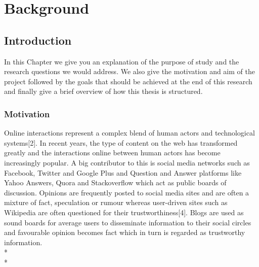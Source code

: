 \part{Background}
\chapter{Introduction}
In this Chapter we give you an explanation of the purpose of study and the research questions we would address. We also give the motivation and aim of the project followed by the goals that should be achieved at the end of this research and finally give a brief overview of how this thesis is structured. 
\section{Motivation}
Online interactions represent a complex blend of human actors and technological systems[2]. In recent years, the type of content on the web has transformed greatly and the interactions online between human actors has become increasingly popular. A big contributor to this is social media networks such as Facebook, Twitter and Google Plus and Question and Answer platforms like Yahoo Answers, Quora and Stackoverflow which act as public boards of discussion.  Opinions are frequently posted to social media sites and are often a mixture of fact, speculation or rumour whereas user-driven sites such as Wikipedia are often questioned for their trustworthiness[4]. Blogs are used as sound boards for average users to disseminate information to their social circles and favourable opinion becomes fact which in turn is regarded as trustworthy information. \\*\\*
